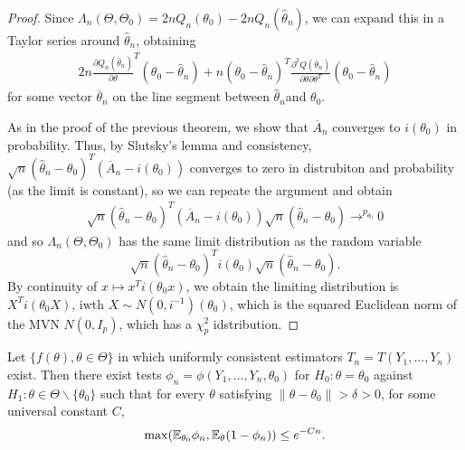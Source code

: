 \begin{proof}
  Since $\Lambda_{n}(\Theta, \Theta_{0}) = 2n Q_{n}(\theta_{0}) - 2n
  Q_{n}(\hat \theta_{n})$, we can expand this in a Taylor series
  around $\hat \theta_{n}$, obtaining
  \begin{align}
    \label{eq:58}
    2 n \frac{\partial Q_{n}(\hat \theta_{n})}{\partial
      \theta}^{T}(\theta_{0} - \hat \theta_{n}) + n(\theta_{0} - \hat
    \theta_{n})^{T} \frac{\partial^{2} Q(\overline
      \theta_{n})}{\partial \theta \partial \theta^{T}} (\theta_{0} -
    \hat \theta_{n})
  \end{align} for some vector $\overline \theta_{n}$ on the line
  segment between $\hat \theta_{n}$and $\theta_{0}$.

  As in the proof of the previous theorem, we show that $\overline
  A_{n}$ converges to $i(\theta_{0})$ in probability.  Thus, by
  Slutsky's lemma and consistency, $\sqrt{n}(\hat \theta_{n} -
  \theta_{0})^{T}(\overline A_{n} - i(\theta_{0}))$ converges to zero
  in distrubiton and probability (as the limit is constant), so we can
  repeate the argument and obtain
  \begin{align}
    \label{eq:59}
    \sqrt{n} (\hat \theta_{n} - \theta_{0})^{T} (\overline A_{n} -
    i(\theta_{0})) \sqrt{n}(\hat \theta_{n} - \theta_{0})
    \rightarrow^{p_{\theta_{0}}} 0
  \end{align} and so $\Lambda_{n}(\Theta, \Theta_{0})$ has the same
  limit distribution as the random variable
  \begin{equation}
    \label{eq:60}
    \sqrt{n}(\hat \theta_{n} - \theta_{0})^{T} i(\theta_{0})
    \sqrt{n}(\hat \theta_{n} - \theta_{0}).
  \end{equation}  By continuity of $x \mapsto x^{T} i(\theta_{0} x)$,
  we obtain the limiting distribution is $X^{T} i(\theta_{0} X)$, iwth
  $X \sim N(0, i^{-1})(\theta_{0})$, which is the squared Euclidean
  norm of the MVN  $N(0, I_{p})$, which has a $\chi^{2}_{p}$ idstribution.
\end{proof}

\begin{thm}
  Let $\{ f(\theta), \theta \in \Theta \} $ in which uniformly
  consistent estimators $T_{n} = T(Y_{1}, \dots, Y_{n})$ exist.  Then
  there exist tests $\phi_{n} = \phi(Y_{1}, \dots, Y_{n}, \theta_{0})$
  for $H_{0}: \theta = \theta_{0}$ against $H_{1}: \theta \in \Theta
  \backslash \{ \theta_{0} \} $ such that for every $\theta$
  satisfying $\| \theta - \theta_{0} \| > \delta > 0$, for some
  universal constant $C$,
  \begin{equation}
    \label{eq:26}
    \max(\E_{\theta_{0}} \phi_{n}, \E_{\theta}(1 - \phi_{n})) \leq e^{-Cn}.
  \end{equation}
\end{thm}

